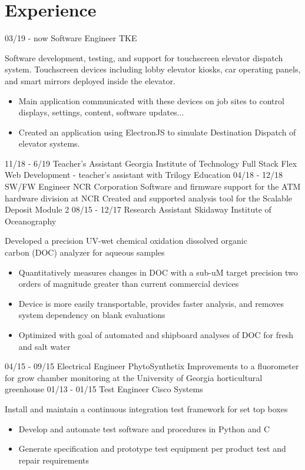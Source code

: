 \documentclass[]{resume}
\begin{document}
\section{Experience}
\begin{entrylist}
	\entry 
	{03/19 - now}
	{Software Engineer}
	{TKE}
	{Software development, testing, and support for touchscreen elevator dispatch system. Touchscreen devices including lobby elevator kiosks, car operating panels, and smart mirrors deployed inside the elevator.
		\begin{itemize}
			\item Main application communicated with these devices on job sites to control displays, settings, content, software updates... 
			\item Created an application using ElectronJS to simulate Destination Dispatch of elevator systems.
		\end{itemize}
	}
	\entry 
	{11/18 - 6/19}
	{Teacher's Assistant}
	{Georgia Institute of Technology}
	{Full Stack Flex Web Development - teacher's assistant with Trilogy Education}
	\entry
	{04/18 - 12/18}
	{SW/FW Engineer}
	{NCR Corporation}
	{Software and firmware support for the ATM hardware division at NCR 
		\newline
	Created and supported analysis tool for the Scalable Deposit Module 2}
	\entry
	{08/15 - 12/17}
	{Research Assistant}
	{Skidaway Institute of Oceanography}
	{Developed a precision UV-wet chemical oxidation dissolved organic\\ carbon (DOC) analyzer for aqueous samples \begin{itemize}
		\item Quantitatively measures changes in DOC with a sub-uM target precision two orders of magnitude greater than current commercial devices
		\item Device is more easily transportable, provides faster analysis, and removes system dependency on blank evaluations
		\item Optimized with goal of automated and shipboard analyses of DOC for fresh and salt water\end{itemize}
	}
	  
	\entry
	{04/15 - 09/15}
	{Electrical Engineer}
	{PhytoSynthetix}
	{Improvements to a fluorometer for grow chamber monitoring at the University of Georgia horticultural greenhouse}
	\entry
	{01/13 - 01/15}
	{Test Engineer}
	{Cisco Systems}
	{Install and maintain a continuous integration test framework for set top boxes
		\begin{itemize}
			\item Develop and automate test software and procedures in Python and C
			\item Generate specification and prototype test equipment per product test and repair requirements
		\end{itemize}
	}
\end{entrylist}
\end{document}
